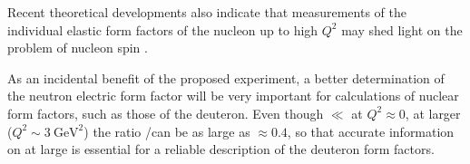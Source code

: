 Recent theoretical developments also indicate that measurements of the individual elastic form factors of the nucleon up to high $Q^2$ may shed light on the problem of nucleon spin \cite{ralston}.
%

As an incidental benefit of the proposed experiment, a better determination of the neutron electric form factor will be very important for calculations of nuclear form factors, such as those of the deuteron.
Even though \gen $\ll$ \gep at $Q^2 \approx 0$, at larger \qsq ($Q^2 \sim 3~\mathrm{GeV}^2$) the ratio \gen/\gep can be as large as
$\approx 0.4$, so that accurate information on \gen at large \qsq is essential for a reliable description of the deuteron form factors.


